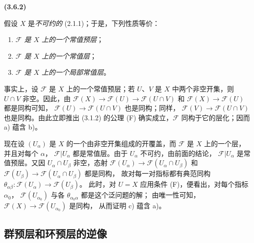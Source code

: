 \documentclass[UTF8,fontset=none,11pt,oneside,openany]{ctexbook}
\newenvironment{env}[1][]{%
  \par\medskip\noindent\textbf{(#1)}\ %
}{\par}
\newcommand{\oldpage}[2][]{%
  \hypertarget{ega-source-page-#1-#2}{}%
  \marginnote{\scriptsize\textbf{#1}~|~#2}\ignorespaces}
\let\EGAOriginalLabel\label
\renewcommand{\label}[1]{\phantomsection\EGAOriginalLabel{#1}}
\begin{document}
\begin{env}[3.6.2]
\label{0.3.6.2-fr}
假设 $X$ 是\emph{不可约的} (2.1.1)；于是，下列性质等价：
\begin{enumerate}
  \item[a)] \emph{$\mathcal{F}$ 是 $X$ 上的一个常值预层}；
  \item[b)] \emph{$\mathcal{F}$ 是 $X$ 上的一个常值层}；
  \item[c)] \emph{$\mathcal{F}$ 是 $X$ 上的一个局部常值层}。
\end{enumerate}

事实上，设 $\mathcal{F}$ 是 $X$ 上的一个常值预层；若 $U$、$V$ 是
$X$ 中两个非空开集，则 $U\cap V$ 非空。因此，由
$\mathcal{F}(X)\to\mathcal{F}(U)\to\mathcal{F}(U\cap V)$ 和
$\mathcal{F}(X)\to\mathcal{F}(U)$ 都是同构可知，
$\mathcal{F}(U)\to\mathcal{F}(U\cap V)$ 也是同构；同样，
$\mathcal{F}(V)\to\mathcal{F}(U\cap V)$ 也是同构。由此立即推出
(3.1.2) 的公理 (F) 确实成立，$\mathcal{F}$ 同构于它的层化；因而 a)
蕴含 b)。

现在设 $(U_\alpha)$ 是 $X$ 的一个由非空开集组成的开覆盖，而
$\mathcal{F}$ 是 $X$ 上的一个层，并且对每个 $\alpha$，
$\mathcal{F}|U_\alpha$ 都是常值层。由于 $U_\alpha$ 不可约，由前面的结论，
$\mathcal{F}|U_\alpha$ 是常值预层。又因
$U_\alpha\cap U_\beta$ 非空，态射
$\mathcal{F}(U_\alpha)\to\mathcal{F}(U_\alpha\cap U_\beta)$ 和
$\mathcal{F}(U_\beta)\to\mathcal{F}(U_\alpha\cap U_\beta)$ 都是同构，
故对每一对指标都有典范同构
$\theta_{\alpha\beta}:\mathcal{F}(U_\alpha)\to\mathcal{F}(U_\beta)$。
此时，对 $U=X$ 应用条件 (F)，便看出，对每个指标 $\alpha_0$，
$\mathcal{F}(U_{\alpha_0})$ 与各 $\theta_{\alpha_0\alpha}$ 都是这个泛问题的解；
由唯一性可知，$\mathcal{F}(X)\to\mathcal{F}(U_{\alpha_0})$ 是同构，
从而证明 c) 蕴含 a)。
\end{env}

\subsection{群预层和环预层的逆像}

\oldpage[0\textsubscript{I}]{34}
\end{document}
